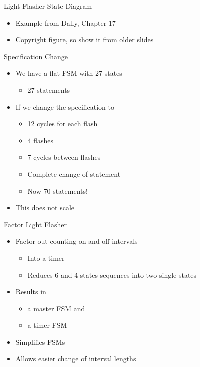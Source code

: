 \begin{frame}[fragile]{Light Flasher State Diagram}
\begin{itemize}
\item Example from Dally, Chapter 17
\item Copyright figure, so show it from older slides
\end{itemize}
\end{frame}

\begin{frame}[fragile]{Specification Change}
\begin{itemize}
\item We have a flat FSM with 27 states
\begin{itemize}
\item 27  statements
\end{itemize}
\item If we change the specification to
\begin{itemize}
\item 12 cycles for each flash
\item 4 flashes
\item 7 cycles between flashes
\item Complete change of  statement
\item Now 70  statements!
\end{itemize}
\item This does not scale
\end{itemize}
\end{frame}

\begin{frame}[fragile]{Factor Light Flasher}
\begin{itemize}
\item Factor out counting on and off intervals
\begin{itemize}
\item Into a timer
\item Reduces 6 and 4 states sequences into two single states
\end{itemize}
\item Results in
\begin{itemize}
\item a master FSM and
\item a timer FSM
\end{itemize}
\item Simplifies FSMs
\item Allows easier change of interval lengths
\end{itemize}
\end{frame}


